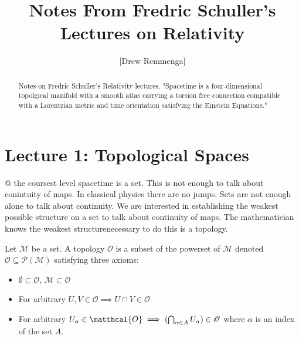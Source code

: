 \documentclass[10pt, oneside]{article}
\title{Notes From Fredric Schuller's Lectures on Relativity}
\author{[Drew Remmenga]}
\begin{document}
\maketitle
\begin{abstract}
    Notes on Fredric Schuller's Relativity lectures. "Spacetime is a four-dimensional topolgical manifold with a smooth atlas carrying a torsion free connection compatible with a Lorentzian metric and time orientation satisfying the Einstein Equations."
\end{abstract}
\section*{Lecture 1: Topological Spaces}
   @ the coursest level spacetime is a set. This is not enough to talk about conintuity of maps. In classical physics there are no jumps. Sets are not enough alone to talk about continuity. We are interested in establishing the weakest possible structure on a set to talk about continuity of maps.
   The mathematician knows the weakest structurenecessary to do this is a topology.
   \begin{Definition}
       Let $\mathcal{M}$ be a set. A topology $\mathcal{O}$ is a subset of the powerset of $\mathcal{M}$ denoted $\mathcal{O} \subseteq \mathcal{P}(\mathcal{M})$ satisfying three axioms: 
      \begin{itemize}
         \item $\emptyset \subset \mathcal{O}$, $\mathcal{M} \subset \mathcal{O}$
         \item For arbitrary $U, V \in \mathcal{O} \implies U \cap V \in \mathcal{O}$
         \item For arbitrary $U_\alpha \in \matthcal{O} \implies (\bigcap_{\alpha \in A} U_\alpha) \in \mathcal{O}$ where $\alpha$ is an index of the set $A$.
      \end{itemize}
   \end{Definition}
\end{document}

